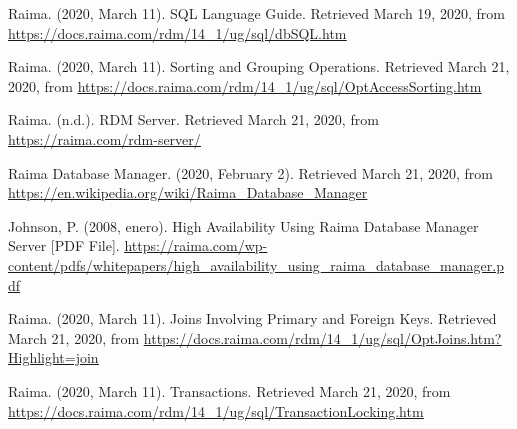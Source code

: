 \documentclass{acmart}
\begin{document}
\begin{thebibliography}{99}
	 Raima. (2020, March 11). SQL Language Guide. Retrieved March 19, 2020, from \href{https://docs.raima.com/rdm/14_1/ug/sql/dbSQL.htm}{\ul{https://docs.raima.com/rdm/14\_1/ug/sql/dbSQL.htm}}\par
	 Raima. (2020, March 11). Sorting and Grouping Operations. Retrieved March 21, 2020, from \href{https://docs.raima.com/rdm/14_1/ug/sql/OptAccessSorting.htm}{\ul{https://docs.raima.com/rdm/14\_1/ug/sql/OptAccessSorting.htm}}\par
	 Raima. (n.d.). RDM Server. Retrieved March 21, 2020, from \href{https://raima.com/rdm-server/}{\ul{https://raima.com/rdm-server/}}\par
	 Raima Database Manager. (2020, February 2). Retrieved March 21, 2020, from \href{https://en.wikipedia.org/wiki/Raima_Database_Manager}{\ul{https://en.wikipedia.org/wiki/Raima\_Database\_Manager}}\par
	 Johnson, P. (2008, enero). High Availability Using Raima Database Manager Server [PDF File]. \href{https://raima.com/wp-content/pdfs/whitepapers/high_availability_using_raima_database_manager.pdf}{\ul{https://raima.com/wp-content/pdfs/whitepapers/high\_availability\_using\_raima\_database\_manager.pdf}}\par
	 Raima. (2020, March 11). Joins Involving Primary and Foreign Keys. Retrieved March 21, 2020, from \href{https://docs.raima.com/rdm/14_1/ug/sql/OptJoins.htm?Highlight=join}{\ul{https://docs.raima.com/rdm/14\_1/ug/sql/OptJoins.htm?Highlight=join}}\par
     Raima. (2020, March 11). Transactions. Retrieved March 21, 2020, from \href{https://docs.raima.com/rdm/14_1/ug/sql/TransactionLocking.htm}{\ul{https://docs.raima.com/rdm/14\_1/ug/sql/TransactionLocking.htm}}

\end{thebibliography}
\end{document}
